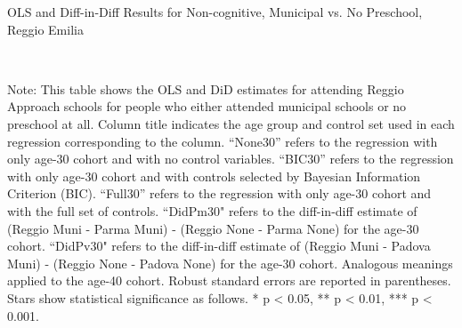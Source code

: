 \begin{landscape}
\begin{table}[H] \caption{OLS and Diff-in-Diff Results for Non-cognitive, Municipal vs. No Preschool, Reggio Emilia} \label{ols-N-reg}
\scalebox{0.85}{
}
\vspace{1ex} \\
\footnotesize\raggedright{Note: This table shows the OLS and DiD estimates for attending Reggio Approach schools for people who either attended municipal schools or no preschool at all. Column title indicates the age group and control set used in each regression corresponding to the column. ``None30'' refers to the regression with only age-30 cohort and with no control variables. ``BIC30'' refers to the regression with only age-30 cohort and with controls selected by Bayesian Information Criterion (BIC). ``Full30'' refers to the regression with only age-30 cohort and with the full set of controls. ``DidPm30" refers to the diff-in-diff estimate of (Reggio Muni - Parma Muni) - (Reggio None - Parma None) for the age-30 cohort. ``DidPv30" refers to the diff-in-diff estimate of (Reggio Muni - Padova Muni) - (Reggio None - Padova None) for the age-30 cohort. Analogous meanings applied to the age-40 cohort. Robust standard errors are reported in parentheses. Stars show statistical significance as follows. * p < 0.05, ** p < 0.01, *** p < 0.001.}
\end{table}



\end{landscape}

